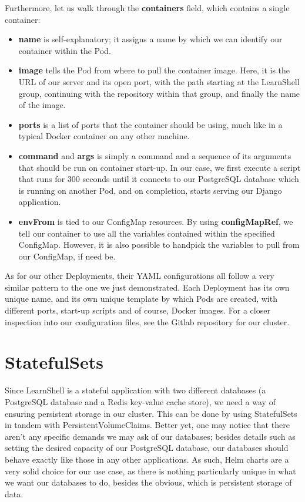 \documentclass[thesis=B,english]{FITthesis}[2019/12/23]
\begin{document}
Furthermore, let us walk through the \textbf{containers} field, which contains a single container:

\begin{itemize}
  \setlength\itemsep{0em}
  \item \textbf{name} is self-explanatory; it assigns a name by which we can identify our container within the Pod.
  \item \textbf{image} tells the Pod from where to pull the container image. Here, it is the URL of our server and its open port, with the path starting at the LearnShell group, continuing with the repository within that group, and finally the name of the image.
  \item \textbf{ports} is a list of ports that the container should be using, much like in a typical Docker container on any other machine.
  \item \textbf{command} and \textbf{args} is simply a command and a sequence of its arguments that should be run on container start-up. In our case, we first execute a script that runs for 300 seconds until it connects to our PostgreSQL database which is running on another Pod, and on completion, starts serving our Django application.
  \item \textbf{envFrom} is tied to our ConfigMap resources. By using \textbf{configMapRef}, we tell our container to use all the variables contained within the specified ConfigMap. However, it is also possible to handpick the variables to pull from our ConfigMap, if need be.
\end{itemize}

As for our other Deployments, their YAML configurations all follow a very similar pattern to the one we just demonstrated. Each Deployment has its own unique name, and its own unique template by which Pods are created, with different ports, start-up scripts and of course, Docker images. For a closer inspection into our configuration files, see the Gitlab repository for our cluster.

\newpage

\section{StatefulSets}

Since LearnShell is a stateful application with two different databases (a PostgreSQL database and a Redis key-value cache store), we need a way of ensuring persistent storage in our cluster. This can be done by using StatefulSets in tandem with PersistentVolumeClaims. Better yet, one may notice that there aren't any specific demands we may ask of our databases; besides details such as setting the desired capacity of our PostgreSQL database, our databases should behave exactly like those in any other applications. As such, Helm charts are a very solid choice for our use case, as there is nothing particularly unique in what we want our databases to do, besides the obvious, which is persistent storage of data.
\end{document}
